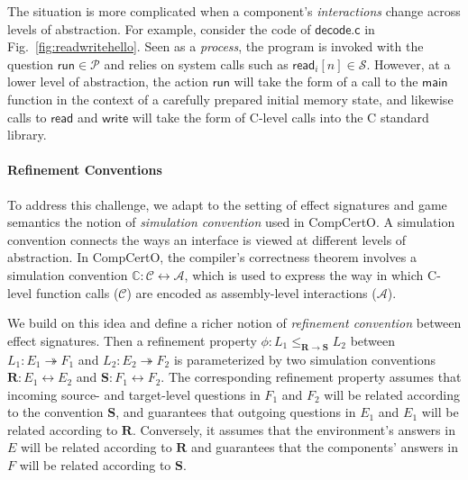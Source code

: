 \documentclass[acmsmall,screen,review,nonacm]{acmart}
\newcommand{\kw}[1]{\ensuremath{ \mathsf{#1} }}
\newcommand{\idsc}{\mathbf{id}} %
\newcommand{\vcomp}{\fatsemi}
\begin{document}
The situation is more complicated
when a component's \emph{interactions} change
across levels of abstraction.
For example,
consider the code of $\kw{decode.c}$
in Fig.~\ref{fig:readwritehello}.
Seen as a \emph{process},
the program is invoked with the question
$\kw{run} \in \mathcal{P}$
and relies on system calls such as $\kw{read}_i[n] \in \mathcal{S}$.
However, at a lower level of abstraction,
the action $\kw{run}$
will take the form of a call to the $\kw{main}$ function
in the context of a carefully prepared initial memory state,
and likewise calls to $\kw{read}$ and $\kw{write}$
will take the form of C-level calls into the C standard library.


\paragraph{Refinement Conventions}

To address this challenge,
we adapt to the setting of effect signatures and game semantics
the notion of \emph{simulation convention} used in CompCertO.
A simulation convention connects
the ways an interface is viewed at different levels of abstraction.
In CompCertO,
the compiler's correctness theorem involves
a simulation convention
$\mathbb{C} : \mathcal{C} \leftrightarrow \mathcal{A}$,
which is used to express the way in which
C-level function calls ($\mathcal{C}$) are encoded
as assembly-level interactions ($\mathcal{A}$).

We build on this idea and
define a richer notion of \emph{refinement convention} between effect signatures.
Then a refinement property
$\phi : L_1 \le_{\mathbf{R} \rightarrow \mathbf{S}} L_2$
between
$L_1 : E_1 \twoheadrightarrow F_1$ and 
$L_2 : E_2 \twoheadrightarrow F_2$
is parameterized by two simulation conventions
$\mathbf{R} : E_1 \leftrightarrow E_2$ and
$\mathbf{S} : F_1 \leftrightarrow F_2$.
The corresponding refinement property assumes that incoming
source- and target-level questions in $F_1$ and $F_2$
will be related according to the convention $\mathbf{S}$,
and guarantees that outgoing questions in $E_1$ and $E_1$
will be related according to $\mathbf{R}$.
Conversely, it assumes that
the environment's answers in $E$
will be related according to $\mathbf{R}$
and guarantees that the components' answers in $F$
will be related according to $\mathbf{S}$.

\end{document}
